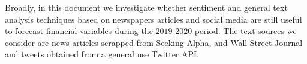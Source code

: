 \documentclass[a4paper, 12pt]{report}
\begin{document}
    
    
    
    Broadly, in this document we investigate whether sentiment and general text analysis techniques based on newspapers articles and social media are still useful to forecast financial variables during the $2019$-$2020$ period. The text sources we consider are news articles scrapped from Seeking Alpha, and Wall Street Journal and tweets obtained from a general use Twitter API.
    
\end{document}
